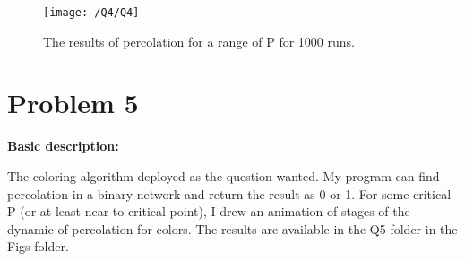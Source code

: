 \documentclass{article}
\begin{document}
    \begin{figure}[!htb]
        \centering
        \texttt{[image: /Q4/Q4]}
        \label{fig:4.1}
        \caption{The results of percolation for a range of P for 1000 runs.}
    \end{figure}

    \section*{Problem 5}
    \textbf{Basic description:}

    The coloring algorithm deployed as the question wanted.
    My program can find percolation in a binary network and return the result as 0 or 1.
    For some critical P (or at least near to critical point),
    I drew an animation of stages of the dynamic of percolation for colors.
    The results are available in the Q5 folder in the Figs folder.
\end{document}
